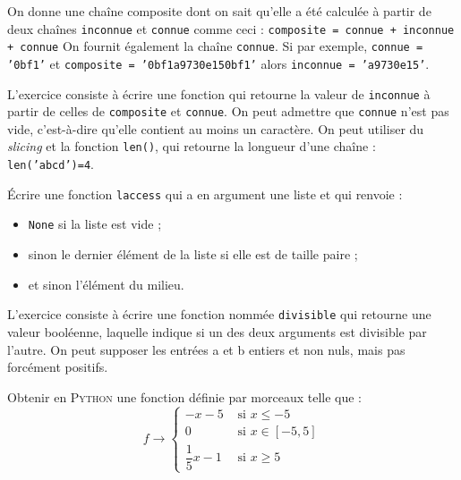 \begin{exercise}[title={Séquences et longueur}, level=intermediate]
On donne une chaîne composite dont on sait qu'elle a été calculée à partir de deux chaînes \texttt{inconnue} et \texttt{connue} comme ceci : \texttt{composite = connue + inconnue + connue}
On fournit également la chaîne \texttt{connue}. Si par exemple, \texttt{connue = '0bf1'} et \texttt{composite = '0bf1a9730e150bf1'} alors \texttt{inconnue = 'a9730e15'}.

L'exercice consiste à écrire une fonction qui retourne la valeur de \texttt{inconnue} à partir de celles de \texttt{composite} et \texttt{connue}. On peut admettre que \texttt{connue} n'est pas vide, c'est-à-dire qu'elle contient au moins un caractère.
On peut utiliser du \textit{slicing} et la fonction \texttt{len()}, qui retourne la longueur d'une chaîne : \texttt{len('abcd')=4}.
\end{exercise}

\begin{exercise}[title={Listes}, level=basic]
Écrire une fonction \texttt{laccess} qui a en argument une liste et qui renvoie :
\begin{itemize}
\item \texttt{None} si la liste est vide ;
\item sinon le dernier élément de la liste si elle est de taille paire ;
\item et sinon l'élément du milieu.
\vspace{-.25\baselineskip}
\end{itemize}
\end{exercise}

\begin{exercise}[title={Fonction de divisibilité}, level=basic]
L'exercice consiste à écrire une fonction nommée \texttt{divisible} qui retourne une valeur booléenne, laquelle indique si un des deux arguments est divisible par l'autre.
On peut supposer les entrées a et b entiers et non nuls, mais pas forcément positifs.
\vspace{-.25\baselineskip}
\end{exercise}

\begin{exercise}[title={Fonction définie par morceaux}, level=basic]
Obtenir en \textsc{Python} une fonction définie par morceaux telle que :
\begin{equation*}
  f \longrightarrow \left\{
  \begin{array}{ll}
  -x - 5 & \mbox{~si~} x \leq -5 \\
  0 & \mbox{~si~} x \in [-5,5] \\
  \dfrac{1}{5}x -1 & \mbox{~si~} x \geq 5
  \end{array}
  \right.
\end{equation*}
\vspace{-\baselineskip}
\end{exercise}

